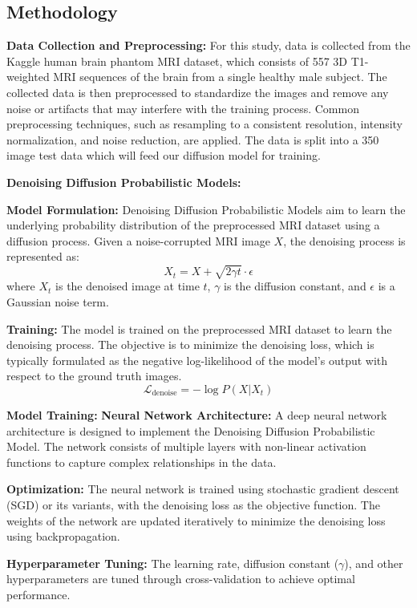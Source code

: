 \subsection*{Methodology}

\textbf{Data Collection and Preprocessing:}
For this study, data is collected from the Kaggle human brain phantom MRI dataset\cite{opfer2023automatic}, which consists of 557 3D T1-weighted MRI sequences of the brain from a single healthy male subject. The collected data is then preprocessed to standardize the images and remove any noise or artifacts that may interfere with the training process. Common preprocessing techniques, such as resampling to a consistent resolution, intensity normalization, and noise reduction, are applied.
The data is split into a 350 image test data which will feed our diffusion model for training.

\textbf{Denoising Diffusion Probabilistic Models:}

   \textbf{Model Formulation:} Denoising Diffusion Probabilistic Models aim to learn the underlying probability distribution of the preprocessed MRI dataset using a diffusion process. Given a noise-corrupted MRI image \(X\), the denoising process is represented as:
   \[ X_t = X + \sqrt{2\gamma t} \cdot \epsilon \]
   where \(X_t\) is the denoised image at time \(t\), \(\gamma\) is the diffusion constant, and \(\epsilon\) is a Gaussian noise term.

   \textbf{Training:} The model is trained on the preprocessed MRI dataset to learn the denoising process. The objective is to minimize the denoising loss, which is typically formulated as the negative log-likelihood of the model's output with respect to the ground truth images.
   \[ \mathcal{L}_{\text{denoise}} = -\log P(X | X_t) \]

\textbf{Model Training:}
\textbf{Neural Network Architecture:} A deep neural network architecture is designed to implement the Denoising Diffusion Probabilistic Model. The network consists of multiple layers with non-linear activation functions to capture complex relationships in the data.

\textbf{Optimization:} The neural network is trained using stochastic gradient descent (SGD) or its variants, with the denoising loss as the objective function. The weights of the network are updated iteratively to minimize the denoising loss using backpropagation.

\textbf{Hyperparameter Tuning:} The learning rate, diffusion constant (\(\gamma\)), and other hyperparameters are tuned through cross-validation to achieve optimal performance.

